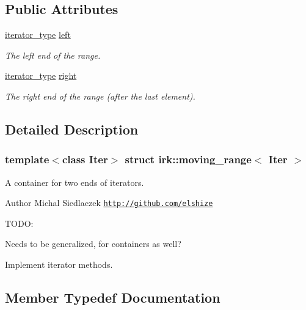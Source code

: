 \subsection*{Public Attributes}
\begin{DoxyCompactItemize}
\item 
\mbox{\hyperlink{structirk_1_1moving__range_ad77e99c581516edfaae4cdb3cc6793ba}{iterator\+\_\+type}} \mbox{\hyperlink{structirk_1_1moving__range_a320ea432eef08a78898777273010d605}{left}}
\begin{DoxyCompactList}\small\item\em The left end of the range. \end{DoxyCompactList}\item 
\mbox{\hyperlink{structirk_1_1moving__range_ad77e99c581516edfaae4cdb3cc6793ba}{iterator\+\_\+type}} \mbox{\hyperlink{structirk_1_1moving__range_a60373930b24fd6f602d42cc06f129229}{right}}
\begin{DoxyCompactList}\small\item\em The right end of the range (after the last element). \end{DoxyCompactList}\end{DoxyCompactItemize}


\subsection{Detailed Description}
\subsubsection*{template$<$class Iter$>$\newline
struct irk\+::moving\+\_\+range$<$ Iter $>$}

A container for two ends of iterators. 

\begin{DoxyAuthor}{Author}
Michal Siedlaczek \href{http://github.com/elshize}{\tt http\+://github.\+com/elshize}
\end{DoxyAuthor}
T\+O\+DO\+:
\begin{DoxyItemize}
\item Needs to be generalized, for containers as well?
\item Implement iterator methods. 
\end{DoxyItemize}

\subsection{Member Typedef Documentation}
\mbox{\label{structirk_1_1moving__range_a53b63b6f5e9e758aab935274c09355de}} 
